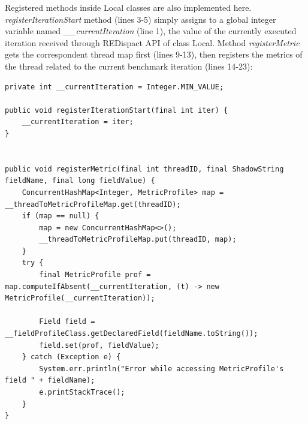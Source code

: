 \documentclass[]{usiinfthesis}
\begin{document}
    \newline    \newline
    Registered methods inside Local classes are also implemented here. \textit{registerIterationStart} method (lines 3-5) simply assigns to a global integer variable named \textit{\_\_currentIteration} (line 1), the value of the currently executed iteration received through REDispact API of class Local. Method \textit{registerMetric} gets the correspondent thread map first (lines 9-13), then registers the metrics of the thread related to the current benchmark iteration (lines 14-23):
    
    \vspace*{0.25cm}
        \begin{verbatim}
private int __currentIteration = Integer.MIN_VALUE;

public void registerIterationStart(final int iter) {
    __currentIteration = iter;
}


public void registerMetric(final int threadID, final ShadowString fieldName, final long fieldValue) {
    ConcurrentHashMap<Integer, MetricProfile> map = __threadToMetricProfileMap.get(threadID);
    if (map == null) {
        map = new ConcurrentHashMap<>();
        __threadToMetricProfileMap.put(threadID, map);
    }
    try {
        final MetricProfile prof = map.computeIfAbsent(__currentIteration, (t) -> new MetricProfile(__currentIteration));

        Field field = __fieldProfileClass.getDeclaredField(fieldName.toString());
        field.set(prof, fieldValue);
    } catch (Exception e) {
        System.err.println("Error while accessing MetricProfile's field " + fieldName);
        e.printStackTrace();
    }
}
    \end{verbatim}
    \vspace*{0.25cm}
    
\end{document}
